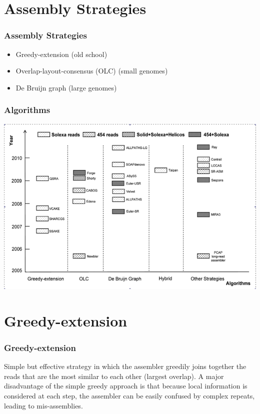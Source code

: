 \documentclass[pdf]{beamer}
\begin{document}
%
\section{Assembly Strategies}
\begin{frame}
\frametitle{Assembly Strategies}
\begin{itemize}
\item Greedy-extension (old school)
\item Overlap-layout-consensus (OLC) (small genomes)
\item De Bruijn graph (large genomes)
\end{itemize}
\end{frame}
\begin{frame}
\frametitle{Algorithms}
\begin{center}
\includegraphics[scale=.32]{Figures/algorithms.png} 
\end{center}
\end{frame}

\section{Greedy-extension}
\begin{frame}
\frametitle{Greedy-extension}
Simple but effective strategy in which the assembler greedily joins together the reads that are the most similar to each other (largest overlap). A major disadvantage of the simple greedy approach is that because local information is considered at each step, the assembler can be easily confused by complex repeats, leading to mis-assemblies.
\end{frame}
\end{document}
